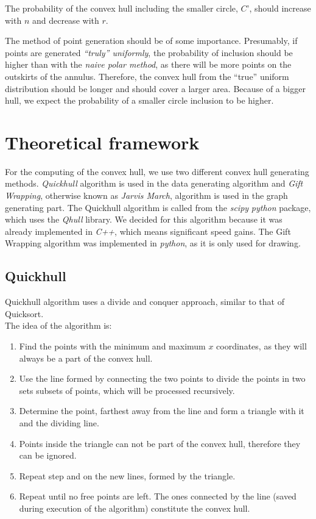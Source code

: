 \documentclass[12pt,a4paper]{article}
\begin{document}
The probability of the convex hull including the smaller circle, $C’$, should increase with $n$ and decrease with $r$. \medskip 
 
The method of point generation should be of some importance. Presumably, if points are generated \textit{“truly” uniformly}, the probability of inclusion should be higher than with the \textit{naive polar method}, as there will be more points on the outskirts of the annulus. Therefore, the convex hull from the “true” uniform distribution should be longer and should cover a larger area. Because of a bigger hull, we expect the probability of a smaller circle inclusion to be higher.
 
\section{Theoretical framework}
For the computing of the convex hull, we use two different convex hull generating methods. \textit{Quickhull} algorithm is used in the data generating algorithm and \textit{Gift Wrapping}, otherwise known as \textit{Jarvis March},  algorithm is used in the graph generating part. The Quickhull algorithm is called from the \textit{scipy} \textit{python} package, which uses the \textit{Qhull} library. We decided for this algorithm because it was already implemented in \textit{C++}, which means significant speed gains. The Gift Wrapping algorithm was implemented in \textit{python}, as  it is only used for drawing.

\subsection{Quickhull}

Quickhull algorithm uses a divide and conquer approach, similar to that of Quicksort. \\

The idea of the algorithm is:
\begin{enumerate}
	\item Find the points with the minimum and maximum $x$ coordinates, as they will always be a part of the convex hull.
	\item Use the line formed by connecting the two points to divide the points in two sets subsets of points, which will be 		processed recursively.
	\item Determine the point, farthest away from the line and form a triangle with it and the dividing line.
	\item Points inside the triangle can not be part of the convex hull, therefore they can be ignored.
	\item Repeat step  and  on the new lines, formed by the triangle.
	\item Repeat until no free points are left. The ones connected by the line (saved during execution of the algorithm)
	constitute the convex hull.
\end{enumerate}
\end{document}

